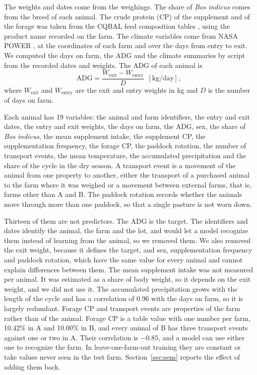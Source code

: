 \documentclass[12pt]{article}
\begin{document}
The weights and dates come from the weighings. The share of \textit{Bos indicus} comes from the breed of each animal. The crude protein (CP) of the supplement and of the forage was taken from the CQBAL feed composition tables \cite{cqbal2023}, using the product name recorded on the farm. The climate variables come from NASA POWER \cite{nasapower2026}, at the coordinates of each farm and over the days from entry to exit. We computed the days on farm, the ADG and the climate summaries by script from the recorded dates and weights.
The ADG of each animal is
\begin{equation}
\mathrm{ADG} = \frac{W_{\mathrm{exit}} - W_{\mathrm{entry}}}{D}\ \ [\mathrm{kg/day}],
\end{equation}
where $W_{\mathrm{exit}}$ and $W_{\mathrm{entry}}$ are the exit and entry weights in kg and $D$ is the number of days on farm.

Each animal has 19 variables: the animal and farm identifiers, the entry and exit dates, the entry and exit weights, the days on farm, the ADG, sex, the share of \textit{Bos indicus}, the mean supplement intake, the supplement CP, the supplementation frequency, the forage CP, the paddock rotation, the number of transport events, the mean temperature, the accumulated precipitation and the share of the cycle in the dry season. A transport event is a movement of the animal from one property to another, either the transport of a purchased animal to the farm where it was weighed or a movement between external farms, that is, farms other than A and B. The paddock rotation records whether the animals move through more than one paddock, so that a single pasture is not worn down.

Thirteen of them are not predictors. The ADG is the target. The identifiers and dates identify the animal, the farm and the lot, and would let a model recognize them instead of learning from the animal, so we removed them. We also removed the exit weight, because it defines the target, and sex, supplementation frequency and paddock rotation, which have the same value for every animal and cannot explain differences between them. The mean supplement intake was not measured per animal. It was estimated as a share of body weight, so it depends on the exit weight, and we did not use it. The accumulated precipitation grows with the length of the cycle and has a correlation of 0.96 with the days on farm, so it is largely redundant. Forage CP and transport events are properties of the farm rather than of the animal. Forage CP is a table value with one number per farm, 10.42\% in A and 10.00\% in B, and every animal of B has three transport events against one or two in A. Their correlation is $-0.85$, and a model can use either one to recognize the farm. In leave-one-farm-out training they are constant or take values never seen in the test farm. Section~\ref{sec:sens} reports the effect of adding them back.
\end{document}
